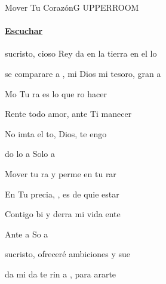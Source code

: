 \documentclass[12pt, spanish]{book}
\newcommand{\NotCCLIed}{\relax}
\begin{document}
    \begin{song}{Mover Tu Corazón}{G}
    {} %
    {UPPERROOM}
    {} %
    {} %
        \ifChordBk
        \paragraph{\mbox{}\hfill\protect\href{https://open.spotify.com/intl-es/track/1npfE6XYVD9lQKHobWkLrR}{Escuchar}\mbox{}\hfill}
        \fi



        \begin{SBOpGroup}
            sucristo, cioso Rey da en la tierra  en el lo

             se comparare a , mi Dios  mi tesoro,  gran a
        \end{SBOpGroup}

        \begin{SBChorus}
            Mo Tu ra es lo que ro hacer

            Rente todo  amor,  ante Ti manecer

            No imta el to, Dios, te engo

            do lo a   Solo a 
        \end{SBChorus}

        \begin{SBOpGroup}
            Mover tu ra y perme en tu rar

            En Tu precia, , es de quie estar

            Contigo bi y derra mi vida ente

            Ante a  So a 
        \end{SBOpGroup}


        \begin{SBOpGroup}
            sucristo,  ofreceré  ambiciones y  sue

            da mi da te rin a  , para ararte
        \end{SBOpGroup}


\end{song}
\end{document}
